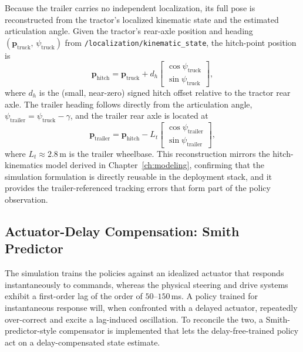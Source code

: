 Because the trailer carries no independent localization, its full pose is reconstructed from the tractor's localized kinematic state and the estimated articulation angle. Given the tractor's rear-axle position and heading $(\mathbf{p}_\text{truck},\, \psi_\text{truck})$ from \texttt{/localization/\allowbreak kinematic\_state}, the hitch-point position is
\begin{equation}
    \mathbf{p}_\text{hitch} = \mathbf{p}_\text{truck} + d_h \begin{bmatrix} \cos\psi_\text{truck} \\ \sin\psi_\text{truck} \end{bmatrix},
\end{equation}
where $d_h$ is the (small, near-zero) signed hitch offset relative to the tractor rear axle. The trailer heading follows directly from the articulation angle, $\psi_\text{trailer} = \psi_\text{truck} - \gamma$, and the trailer rear axle is located at
\begin{equation}
    \mathbf{p}_\text{trailer} = \mathbf{p}_\text{hitch} - L_t \begin{bmatrix} \cos\psi_\text{trailer} \\ \sin\psi_\text{trailer} \end{bmatrix},
\end{equation}
where $L_t \approx 2.8$\,m is the trailer wheelbase. This reconstruction mirrors the hitch-kinematics model derived in Chapter~\ref{ch:modeling}, confirming that the simulation formulation is directly reusable in the deployment stack, and it provides the trailer-referenced tracking errors that form part of the policy observation.

\subsection{Actuator-Delay Compensation: Smith Predictor}
\label{sec:smith_predictor}

The simulation trains the policies against an idealized actuator that responds instantaneously to commands, whereas the physical steering and drive systems exhibit a first-order lag of the order of $50$--$150$\,ms. A policy trained for instantaneous response will, when confronted with a delayed actuator, repeatedly over-correct and excite a lag-induced oscillation. To reconcile the two, a Smith-predictor-style compensator is implemented that lets the delay-free-trained policy act on a delay-compensated state estimate.

